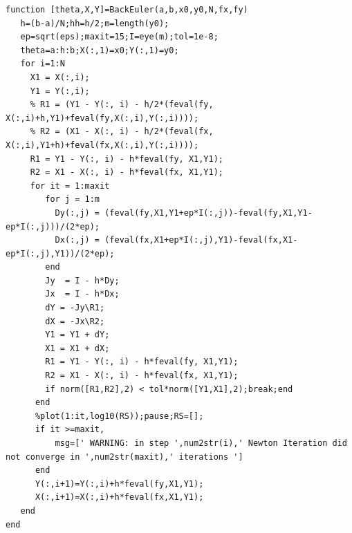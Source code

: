 \documentclass[letterpaper, reqno,11pt]{article}
\begin{document}
\begin{lstlisting}
function [theta,X,Y]=BackEuler(a,b,x0,y0,N,fx,fy)
   h=(b-a)/N;hh=h/2;m=length(y0);
   ep=sqrt(eps);maxit=15;I=eye(m);tol=1e-8;
   theta=a:h:b;X(:,1)=x0;Y(:,1)=y0;
   for i=1:N
     X1 = X(:,i);
     Y1 = Y(:,i);
     % R1 = (Y1 - Y(:, i) - h/2*(feval(fy, X(:,i)+h,Y1)+feval(fy,X(:,i),Y(:,i))));
     % R2 = (X1 - X(:, i) - h/2*(feval(fx, X(:,i),Y1+h)+feval(fx,X(:,i),Y(:,i))));
     R1 = Y1 - Y(:, i) - h*feval(fy, X1,Y1);
     R2 = X1 - X(:, i) - h*feval(fx, X1,Y1);
     for it = 1:maxit 
        for j = 1:m
          Dy(:,j) = (feval(fy,X1,Y1+ep*I(:,j))-feval(fy,X1,Y1-ep*I(:,j)))/(2*ep);
          Dx(:,j) = (feval(fx,X1+ep*I(:,j),Y1)-feval(fx,X1-ep*I(:,j),Y1))/(2*ep);
        end
        Jy  = I - h*Dy;
        Jx  = I - h*Dx;
        dY = -Jy\R1;
        dX = -Jx\R2;
        Y1 = Y1 + dY;
        X1 = X1 + dX;
        R1 = Y1 - Y(:, i) - h*feval(fy, X1,Y1);
        R2 = X1 - X(:, i) - h*feval(fx, X1,Y1);
        if norm([R1,R2],2) < tol*norm([Y1,X1],2);break;end
      end
      %plot(1:it,log10(RS));pause;RS=[];
      if it >=maxit,
          msg=[' WARNING: in step ',num2str(i),' Newton Iteration did not converge in ',num2str(maxit),' iterations ']
      end
      Y(:,i+1)=Y(:,i)+h*feval(fy,X1,Y1);
      X(:,i+1)=X(:,i)+h*feval(fx,X1,Y1);
   end
end
\end{lstlisting}
\end{document}
